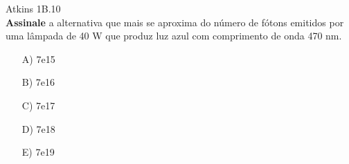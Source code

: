 \begin{problem}[answer = B]
 
    Atkins 1B.10\\
    \textbf{Assinale} a alternativa que mais se aproxima do número de fótons emitidos por uma lâmpada de 40 W que produz luz azul com comprimento de onda 470 nm.
    \begin{itemize}
        \item [A)] 7e15
        \item [B)] 7e16
        \item [C)] 7e17
        \item [D)] 7e18
        \item [E)] 7e19
    \end{itemize}

\end{problem}